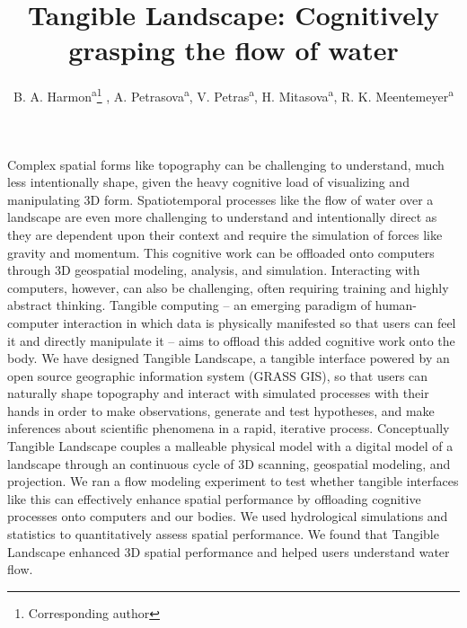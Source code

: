 \documentclass{isprs}
\begin{document}
\title{Tangible Landscape: Cognitively grasping the flow of water}

\author{
 B. A. Harmon\textsuperscript{a}\thanks{Corresponding author}
 , A. Petrasova\textsuperscript{a}, V. Petras\textsuperscript{a}, H. Mitasova\textsuperscript{a}, R. K. Meentemeyer\textsuperscript{a}}

\address
{
	\textsuperscript{a }Center for Geospatial Analytics, North Carolina State University - (baharmon, akratoc, vpetras, hmitaso, rkmeente)@ncsu.edu\\
}

\commission{}{} %
\workinggroup{} %
\icwg{}   %

\abstract
{
Complex spatial forms like topography can be challenging to understand, much less intentionally shape, given the heavy cognitive load of visualizing and manipulating 3D form. Spatiotemporal processes like the flow of water over a landscape are even more challenging to understand and intentionally direct as they are dependent upon their context and require the simulation of forces like gravity and momentum. This cognitive work can be offloaded onto computers through 3D geospatial modeling, analysis, and simulation.
Interacting with computers, however, can also be challenging, often requiring training and highly abstract thinking. Tangible computing -- an emerging paradigm of human-computer interaction in which data is physically manifested so that users can feel it and directly manipulate it -- aims to offload this added cognitive work onto the body. We have designed Tangible Landscape, a tangible interface powered by an open source geographic information system (GRASS GIS), so that users can naturally shape topography and interact with simulated processes with their hands in order to make observations, generate and test hypotheses, and make inferences about scientific phenomena in a rapid, iterative process. Conceptually Tangible Landscape couples a malleable physical model with a digital model of a landscape through an continuous cycle of 3D scanning, geospatial modeling, and projection. 
We ran a flow modeling experiment to test whether tangible interfaces like this can effectively enhance spatial performance by offloading cognitive processes onto computers and our bodies. We used hydrological simulations and statistics to quantitatively assess spatial performance. We found that Tangible Landscape enhanced 3D spatial performance and helped users understand water flow. 
}
\end{document}
